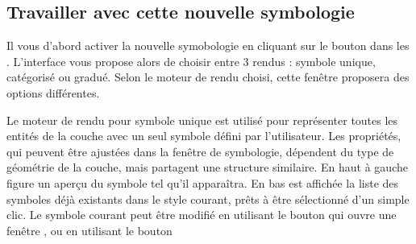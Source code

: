 \subsection{Travailler avec cette nouvelle symbologie}

Il vous d'abord activer la nouvelle symobologie en cliquant sur le bouton  dans les . L'interface vous propose alors de choisir entre 3 rendus : symbole unique, catégorisé ou gradué. Selon le moteur de rendu choisi, cette fenêtre proposera des options différentes.


Le moteur de rendu pour symbole unique est utilisé pour représenter toutes les entités de la couche avec un seul symbole défini par l'utilisateur. Les propriétés, qui peuvent être ajustées dans la fenêtre de symbologie, dépendent du type de géométrie de la couche, mais partagent une structure similaire. En haut à gauche figure un aperçu du symbole tel qu'il apparaîtra. En bas est affichée la liste des symboles déjà existants dans le style courant, prêts à être sélectionné d'un simple clic. Le symbole courant peut être modifié en utilisant le bouton  qui ouvre une fenêtre , ou en utilisant le bouton \button{}


